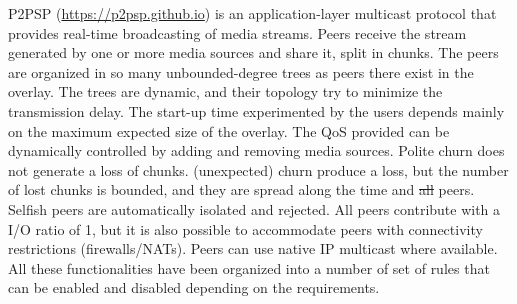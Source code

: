 

P2PSP (\url{https://p2psp.github.io}) is an application-layer
multicast protocol that provides real-time broadcasting of media
streams. Peers receive the stream generated by one or more media
sources and share it, split in chunks. The peers are organized in
so many unbounded-degree trees as peers there exist in the
overlay. The trees are dynamic, and their topology try to minimize the
transmission delay. The start-up time experimented by the users depends
mainly on the maximum expected size of the overlay. The QoS provided
can be dynamically controlled by adding and removing media
sources. Polite churn does not generate a loss of chunks. 
(unexpected) churn produce a loss, but the number of lost chunks is
bounded, and they are spread along the time and \st{all}  peers. Selfish
peers are automatically isolated and rejected. All peers contribute
with a I/O ratio of 1, but it is also possible to accommodate peers
with connectivity restrictions (firewalls/NATs). Peers can use native IP
multicast where available. All these functionalities
have been organized into a number of set of rules that can be enabled
and disabled depending on the requirements.
